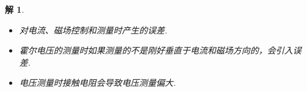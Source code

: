 \documentclass[UTF8,10pt,a4paper]{article}
\theoremstyle{Problem}
\theoremstyle{Solution}
\newtheorem*{sol}{解}
\begin{document}
\begin{sol}
\begin{enumerate}
\begin{itemize}
\begin{itemize}
                当材料中同时存在两种载流子$e$（电子）和$h$（空穴）时，外加电场和总电流间的关系为
                \begin{align}
                    \vec{E}=\rho(\vec{j}_e+\vec{j}_h).
                \end{align}
                可以想见，此时的电阻率矩阵是一个与$n_e$（电子的数密度）和$n_h$（空穴的数密度）相关的比较复杂的形式，从这一矩阵的各个矩阵元从中推算载流子数密度一定要小心.
                \item 对电流、磁场控制和测量时产生的误差.
                \item 霍尔电压的测量时如果测量的不是刚好垂直于电流和磁场方向的，会引入误差.
                \item 电压测量时接触电阻会导致电压测量偏大.
            \end{itemize}
        \end{itemize}
    \end{enumerate}
\end{sol}
\end{document}

